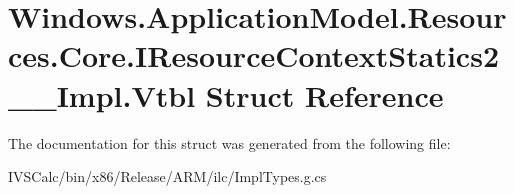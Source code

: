 \hypertarget{struct_windows_1_1_application_model_1_1_resources_1_1_core_1_1_i_resource_context_statics2_____impl_1_1_vtbl}{}\section{Windows.\+Application\+Model.\+Resources.\+Core.\+I\+Resource\+Context\+Statics2\+\_\+\+\_\+\+Impl.\+Vtbl Struct Reference}
\label{struct_windows_1_1_application_model_1_1_resources_1_1_core_1_1_i_resource_context_statics2_____impl_1_1_vtbl}


The documentation for this struct was generated from the following file\+:\begin{DoxyCompactItemize}
\item 
I\+V\+S\+Calc/bin/x86/\+Release/\+A\+R\+M/ilc/Impl\+Types.\+g.\+cs\end{DoxyCompactItemize}
